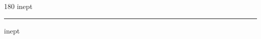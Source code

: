 
\begin{frame}
\begin{center}
\begin{turn}{180}
{\fontsize{2.5cm}{1em}\selectfont inept}
\end{turn}
\vspace{1em}\par  
\hrule
\vspace{1em}\par  
{\fontsize{2.5cm}{1em}\selectfont inept}
\end{center}
\end{frame}
